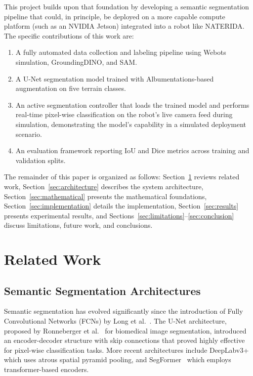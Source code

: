 \documentclass[12pt,a4paper]{article}
\begin{document}
This project builds upon that foundation by developing a semantic segmentation pipeline that could, in principle, be deployed on a more capable compute platform (such as an NVIDIA Jetson) integrated into a robot like NATERIDA. The specific contributions of this work are:

\begin{enumerate}[noitemsep]
    \item A fully automated data collection and labeling pipeline using Webots simulation, GroundingDINO, and SAM.
    \item A U-Net segmentation model trained with Albumentations-based augmentation on five terrain classes.
    \item An active segmentation controller that loads the trained model and performs real-time pixel-wise classification on the robot's live camera feed during simulation, demonstrating the model's capability in a simulated deployment scenario.
    \item An evaluation framework reporting IoU and Dice metrics across training and validation splits.
\end{enumerate}

The remainder of this paper is organized as follows: Section~\ref{sec:related} reviews related work, Section~\ref{sec:architecture} describes the system architecture, Section~\ref{sec:mathematical} presents the mathematical foundations, Section~\ref{sec:implementation} details the implementation, Section~\ref{sec:results} presents experimental results, and Sections~\ref{sec:limitations}--\ref{sec:conclusion} discuss limitations, future work, and conclusions.

\section{Related Work}
\label{sec:related}

\subsection{Semantic Segmentation Architectures}

Semantic segmentation has evolved significantly since the introduction of Fully Convolutional Networks (FCNs) by Long et al.~\cite{long2015}. The U-Net architecture, proposed by Ronneberger et al.~\cite{ronneberger2015} for biomedical image segmentation, introduced an encoder-decoder structure with skip connections that proved highly effective for pixel-wise classification tasks. More recent architectures include DeepLabv3+~\cite{chen2018} which uses atrous spatial pyramid pooling, and SegFormer~\cite{xie2021} which employs transformer-based encoders.
\end{document}
